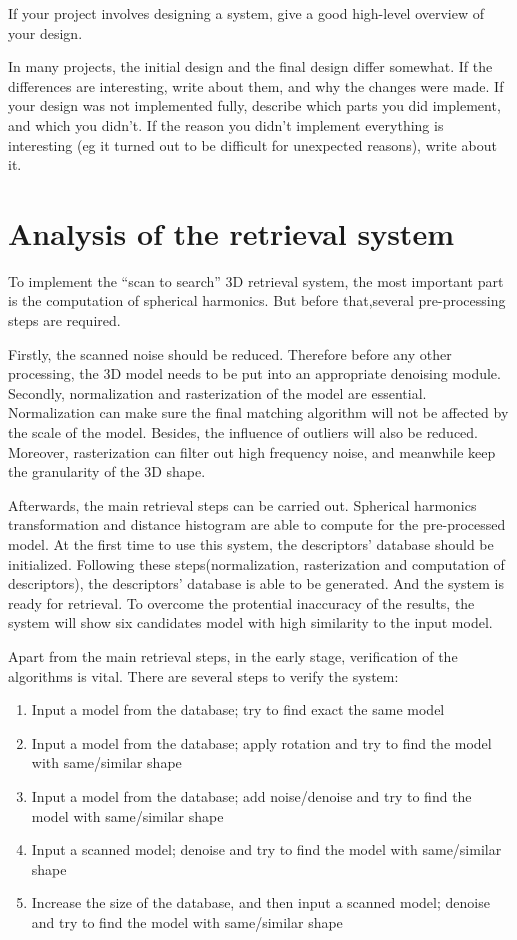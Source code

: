 If your project involves designing a system, give a good high-level overview of your design.
 
In many projects, the initial design and the final design differ somewhat. If the differences are interesting, write about them, and why the changes were made.
If your design was not implemented fully, describe which parts you did implement, and which you didn't. If the reason you didn't implement everything is interesting (eg it turned out to be difficult for unexpected reasons), write about it.


\section{Analysis of the retrieval system}

To implement the ``scan to search'' 3D retrieval system, the most important part is the computation of spherical harmonics. But before that,several pre-processing steps are required. 

Firstly, the scanned noise should be reduced. Therefore before any other processing, the 3D model needs to be put into an appropriate denoising module. Secondly, normalization and rasterization of the model are essential. Normalization can make sure the final matching algorithm will not be affected by the scale of the model. Besides, the influence of outliers will also be reduced. Moreover, rasterization can filter out high frequency noise, and meanwhile keep the granularity of the 3D shape. 

Afterwards, the main retrieval steps can be carried out. Spherical harmonics transformation and distance histogram are able to compute for the pre-processed model. At the first time to use this system, the descriptors' database should be initialized. Following these steps(normalization, rasterization and computation of descriptors), the descriptors' database is able to be generated. And the system is ready for retrieval. To overcome the protential inaccuracy of the results, the system will show six candidates model with high similarity to the input model.

Apart from the main retrieval steps, in the early stage, verification of the algorithms is vital. There are several steps to verify the system: 

\begin{enumerate}[1)]
\item Input a model from the database; try to find exact the same model
\item Input a model from the database; apply rotation and try to find the model with same/similar shape
\item Input a model from the database; add noise/denoise and try to find the model with same/similar shape
\item Input a scanned model; denoise and try to find the model with same/similar shape
\item Increase the size of the database, and then input a scanned model; denoise and try to find the model with same/similar shape
\end{enumerate}


